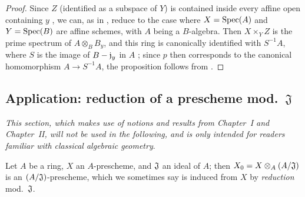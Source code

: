 \begin{proof}
\label{proof-1.3.6.5}
Since $Z$ (identified as a subspace of $Y$) is contained inside every affine open containing $y$ , we can, as in , reduce to the case where $X={\mathop{\mathrm{Spec}}\nolimits}(A)$ and $Y={\mathop{\mathrm{Spec}}\nolimits}(B)$ are affine schemes, with $A$ being a $B$-algebra.
Then $X\times_Y Z$ is the prime spectrum of $A\otimes_B B_y$, and this ring is canonically identified with $S^{-1}A$, where $S$ is the image of $B-\mathfrak{j}_y$ in $A$ ; since $p$ then corresponds to the canonical homomorphism $A\to S^{-1}A$, the proposition follows from .
\end{proof}

\subsection{Application: reduction of a prescheme mod.~$\mathfrak{J}$}
\label{subsection:reduction-of-a-prescheme}

\emph{This section, which makes use of notions and results from Chapter~I and Chapter~II, will not be used in the following, and is only intended for readers familiar with classical algebraic geometry}.

\begin{env}[3.7.1]
\label{1.3.7.1}
Let $A$ be a ring, $X$ an $A$-prescheme, and $\mathfrak{J}$ an ideal of $A$; then $X_0=X\otimes_A(A/\mathfrak{J})$ is an $(A/\mathfrak{J})$-prescheme, which we sometimes say is induced from $X$ by \emph{reduction} mod.~$\mathfrak{J}$.
\end{env}

